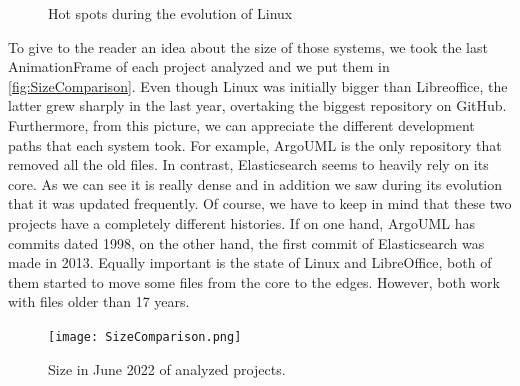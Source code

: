 \begin{figure}[ht]
    \caption{Hot spots during the evolution of Linux} 
    \label{fig:Linux_V7}
\end{figure}

\clearpage
To give to the reader an idea about the size of those systems, we took the last AnimationFrame of each project analyzed and we put them in \autoref{fig:SizeComparison}. Even though Linux was initially bigger than Libreoffice, the latter grew sharply in the last year, overtaking the biggest repository on GitHub. Furthermore, from this picture, we can appreciate the different development paths that each system took. For example, ArgoUML is the only repository that removed all the old files. In contrast, Elasticsearch seems to heavily rely on its core. As we can see it is really dense and in addition we saw during its evolution that it was updated frequently. Of course, we have to keep in mind that these two projects have a completely different histories. If on one hand, ArgoUML has commits dated 1998, on the other hand, the first commit of Elasticsearch was made in 2013. Equally important is the state of Linux and LibreOffice, both of them started to move some files from the core to the edges. However, both work with files older than 17 years. 

\begin{figure}[ht]
    \centering
    \texttt{[image: SizeComparison.png]}
    \caption{Size in June 2022 of analyzed projects.} 
    \label{fig:SizeComparison}
\end{figure}
